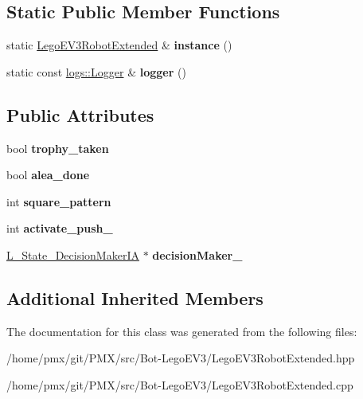 \subsection*{Static Public Member Functions}
\begin{DoxyCompactItemize}
\item 
\mbox{\label{classLegoEV3RobotExtended_a37e259a4bc3f0c051a07c5555e276a72}} 
static \hyperlink{classLegoEV3RobotExtended}{Lego\+E\+V3\+Robot\+Extended} \& {\bfseries instance} ()
\item 
\mbox{\label{classLegoEV3RobotExtended_ac71f276f51e8a8782a4416555817ce2e}} 
static const \hyperlink{classlogs_1_1Logger}{logs\+::\+Logger} \& {\bfseries logger} ()
\end{DoxyCompactItemize}
\subsection*{Public Attributes}
\begin{DoxyCompactItemize}
\item 
\mbox{\label{classLegoEV3RobotExtended_ad9d3898ba44c5f044ea1a4d1ab0a784c}} 
bool {\bfseries trophy\+\_\+taken}
\item 
\mbox{\label{classLegoEV3RobotExtended_a6c95d00f93201adb5f4bb7e183a46ae9}} 
bool {\bfseries alea\+\_\+done}
\item 
\mbox{\label{classLegoEV3RobotExtended_a4101315ff7b7d797f9cccd04baba47b7}} 
int {\bfseries square\+\_\+pattern}
\item 
\mbox{\label{classLegoEV3RobotExtended_a6f43e60598aa6bfc53be386fbcf4caf5}} 
int {\bfseries activate\+\_\+push\+\_}
\item 
\mbox{\label{classLegoEV3RobotExtended_ad2ed8e9c7e2cc0c3eb4526c121a05a70}} 
\hyperlink{classL__State__DecisionMakerIA}{L\+\_\+\+State\+\_\+\+Decision\+Maker\+IA} $\ast$ {\bfseries decision\+Maker\+\_\+}
\end{DoxyCompactItemize}
\subsection*{Additional Inherited Members}


The documentation for this class was generated from the following files\+:\begin{DoxyCompactItemize}
\item 
/home/pmx/git/\+P\+M\+X/src/\+Bot-\/\+Lego\+E\+V3/Lego\+E\+V3\+Robot\+Extended.\+hpp\item 
/home/pmx/git/\+P\+M\+X/src/\+Bot-\/\+Lego\+E\+V3/Lego\+E\+V3\+Robot\+Extended.\+cpp\end{DoxyCompactItemize}
